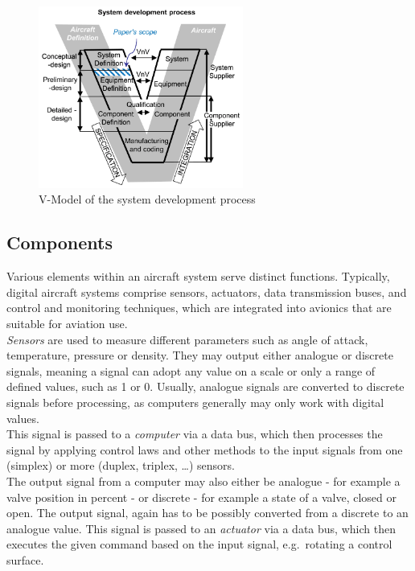 \begin{figure}
    \centering
    \includegraphics[width=0.6\textwidth]{Pictures/res/fundamentals/v-modell}
    \caption{V-Model of the system development process~\cite{doi:10.1177/09544100211024787}}
    \label{fig:v-model}
\end{figure}
\subsection{Components}\label{subsec:components}
Various elements within an aircraft system serve distinct functions.
Typically, digital aircraft systems comprise sensors, actuators, data transmission buses,
and control and monitoring techniques, which are integrated into avionics that are suitable for aviation use.
\\
\textit{Sensors} are used to measure different parameters such as angle of attack, temperature, pressure or density.
They may output either analogue or discrete signals, meaning a signal can adopt any value on a scale or only a range of defined values,
such as 1 or 0.
Usually, analogue signals are converted to discrete signals before processing, as computers generally may only work with digital
values.
\\
This signal is passed to a \textit{computer} via a data bus, which then processes the signal by applying control laws and other methods to the
input signals from one (simplex) or more (duplex, triplex, \ldots) sensors.
\\
The output signal from a computer may also either be analogue - for example a valve position in percent - or discrete - for
example a state of a valve, closed or open.
The output signal, again has to be possibly converted from a discrete to an analogue value.
This signal is passed to an \textit{actuator} via a data bus, which then executes the given command based on the input signal,
e.g.\ rotating a control surface.



